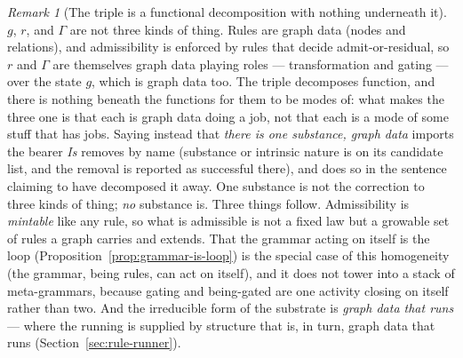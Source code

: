 \documentclass[11pt,a4paper]{article}
\theoremstyle{remark}\newtheorem{remark}[definition]{Remark}
\begin{document}
\begin{remark}[The triple is a functional decomposition with nothing underneath it]\label{rem:one-substance}
$g$, $r$, and $\Gamma$ are not three kinds of thing. Rules are graph data (nodes and relations), and admissibility is enforced by rules that decide admit-or-residual, so $r$ and $\Gamma$ are themselves graph data playing roles --- transformation and gating --- over the state $g$, which is graph data too. The triple decomposes function, and there is nothing beneath the functions for them to be modes of:
what makes the three one is that each is graph data doing a job, not that each is a mode of some stuff
that has jobs. Saying instead that \emph{there is one substance, graph data} imports the bearer \emph{Is} removes by name (substance or intrinsic nature is on its candidate list, and the
removal is reported as successful there), and does so in the sentence claiming to have decomposed it
away. One substance is not the correction to three kinds of thing; \emph{no} substance is. Three things follow. Admissibility is \emph{mintable} like any rule, so what is admissible is not a fixed law but a growable set of rules a graph carries and extends. That the grammar acting on itself is the loop (Proposition~\ref{prop:grammar-is-loop}) is the special case of this homogeneity (the grammar, being rules, can act on itself), and it does not tower into a stack of meta-grammars, because gating and being-gated are one activity closing on itself rather than two. And the irreducible form of the substrate is \emph{graph data that runs} --- where the running is supplied by structure that is, in turn, graph data that runs (Section~\ref{sec:rule-runner}).
\end{remark}
\end{document}
